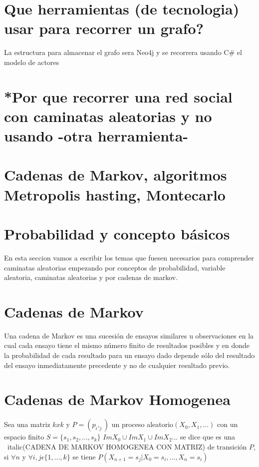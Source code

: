 \section {Que herramientas (de tecnologia) usar para recorrer un grafo?}
La estructura para almacenar el grafo sera Neo4j  y se recorrera usando C#  el modelo de actores
\section {*Por que recorrer una red social con caminatas aleatorias y no usando  -otra herramienta-}

\section{Cadenas de Markov, algoritmos Metropolis hasting, Montecarlo}





\section{Probabilidad y concepto b\'asicos}
En esta seccion vamos a escribir los temas que fuesen necesarios para comprender
caminatas aleatorias empezando por conceptos de probabilidad, variable aleatoria,
caminatas aleatorias y por cadenas de markov.
\section{Cadenas de Markov}



Una cadena de Markov es una sucesi\'on de ensayos similares u observaciones en la cual cada ensayo tiene el mismo n\'umero finito de resultados posibles y en donde la probabilidad de cada resultado para un ensayo dado depende s\'olo del resultado del ensayo inmediatamente precedente y no de cualquier resultado previo.


\section{Cadenas de Markov Homogenea}

Sea una matriz $k x k$ y $P = (p_i,_j)$ un proceso aleatorio$(X_0,X_1,...)$ con un espacio finito $S = \{s_1,s_2,...,s_k\}$ $ Im X_0 \cup Im X_1 \cup ImX_2$... se dice que es una ~italic(CADENA DE MARKOV HOMOGENEA CON MATRIZ) de transici\'on $P$, si $\forall n$ y $\forall i,j \epsilon \{1,...,k\} $ se tiene $P(X_{n +1} = s_j | X_0 = s_i,..., X_n = s_i)$\\



